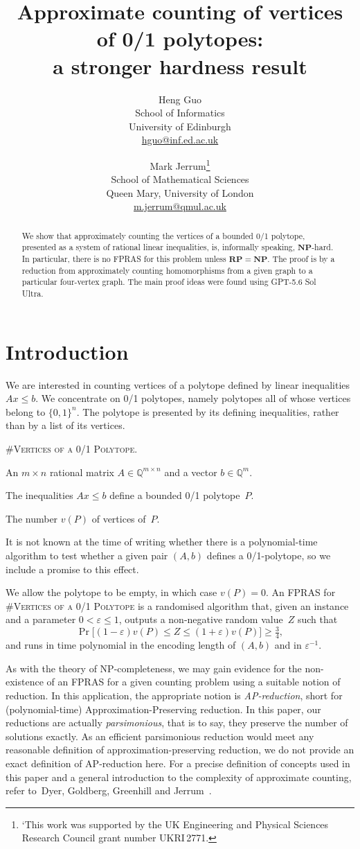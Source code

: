 \documentclass[11pt, oneside]{article}   	%
\title{Approximate counting of vertices of 0/1 polytopes: \\ a stronger hardness result}
\author{Heng Guo\\School of Informatics\\University of Edinburgh\\\url{hguo@inf.ed.ac.uk} \and
Mark Jerrum\thanks{‘This work was supported by the UK Engineering and Physical Sciences Research Council grant number UKRI\,2771.}
\\School of Mathematical Sciences\\Queen Mary, University of London\\\url{m.jerrum@qmul.ac.uk}}
\date{}							%
\def\NP{\ensuremath{\mathbf{NP}}}
\def\RP{\ensuremath{\mathbf{RP}}}
\def\Qset{\mathbb{Q}}
\def\nPolytopeVertices{\textsc{\#Vertices of a 0/1 Polytope}}
\def\eps{\varepsilon}
\begin{document}
\maketitle

\begin{abstract}
We show that approximately counting the vertices of a bounded 0/1 polytope, presented as a system of rational linear inequalities, is, informally speaking, $\NP$-hard.   In particular, there is no FPRAS for this problem unless $\RP=\NP$.  The proof is by a reduction from approximately counting homomorphisms from a given graph to a particular four-vertex graph.  
The main proof ideas were found using GPT-5.6 Sol Ultra.

\end{abstract}


\section{Introduction}

We are interested in counting vertices of a polytope defined by linear inequalities $Ax\leq b$.  We concentrate on 0/1 polytopes, namely polytopes all of whose vertices belong to $\{0,1\}^n$.  The polytope is presented by its defining inequalities, rather than by a list of its vertices.
\begin{description}[itemsep=0pt]
\item [Problem:] \nPolytopeVertices.
\item [Instance:] An $m\times n$ rational matrix $A\in\Qset^{m\times n}$ and a vector $b\in\Qset^m$.
\item [Promise:] The inequalities $Ax\leq b$ define a bounded 0/1 polytope~$P$.
\item [Output:] The number $v(P)$ of vertices of~$P$.
\end{description}
It is not known at the time of writing whether there is a polynomial-time algorithm to test whether a given pair $(A,b)$ defines a 0/1-polytope, so we include a promise to this effect.

We allow the polytope to be empty, in which case $v(P)=0$.  An FPRAS for \nPolytopeVertices{} is a randomised algorithm that, given an instance and a parameter $0<\eps\leq1$, outputs a non-negative random value~$Z$ such that
\[
 \Pr\big[(1-\eps)v(P)\leq Z\leq(1+\eps)v(P)\big]\geq\tfrac34,
\]
and runs in time polynomial in the encoding length of $(A,b)$ and in $\eps^{-1}$.

As with the theory of NP-completeness, we may gain evidence for the non-existence of an FPRAS for a given counting problem using a suitable notion of reduction.  In this application, the appropriate notion is \textit{AP-reduction}, short for (polynomial-time) Approximation-Preserving reduction.   In this paper, our reductions are actually \textit{parsimonious}, that is to say, they preserve the number of solutions exactly.  As an efficient parsimonious reduction would meet any reasonable definition of approximation-preserving reduction, we do not provide an exact definition of AP-reduction here.  For a precise definition of concepts used in this paper and a general introduction to the complexity of approximate counting, refer to~Dyer, Goldberg, Greenhill and Jerrum~\cite{Relative}. 
\end{document}
